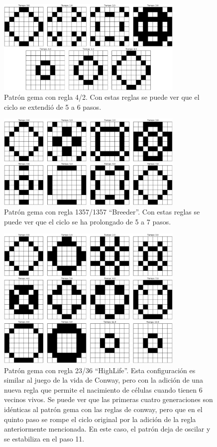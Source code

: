 \documentclass[12pt]{article}
\begin{document}
\begin{figure}
  \centering
  \includegraphics[width=0.8\textwidth]{imagenes/gema4-2.png}
  \caption{Patrón gema con regla 4/2. Con estas reglas se puede ver que el ciclo se extendió de 5 a 6 pasos.\label{img:gema4-2}}
\end{figure}

\begin{figure}
  \centering
  \includegraphics[width=0.8\textwidth]{imagenes/gema1357-1357.png}
  \caption{Patrón gema con regla 1357/1357 ``Breeder''. Con estas reglas se puede ver que el ciclo se ha prolongado de 5 a 7 pasos.\label{img:gema1357-1357}}
\end{figure}

\begin{figure}
  \centering
  \includegraphics[width=0.8\textwidth]{imagenes/gema23-36.png}
  \caption{Patrón gema con regla 23/36 ``HighLife''. Esta configuración es similar al juego de la vida de Conway, pero con la adición de una nueva regla que permite el nacimiento de células cuando tienen 6 vecinos vivos. Se puede ver que las primeras cuatro generaciones son idénticas al patrón gema con las reglas de conway, pero que en el quinto paso se rompe el ciclo original por la adición de la regla anteriormente mencionada. En este caso, el patrón deja de oscilar y se estabiliza en el paso 11.\label{img:gema23-36}}
\end{figure}
\end{document}
